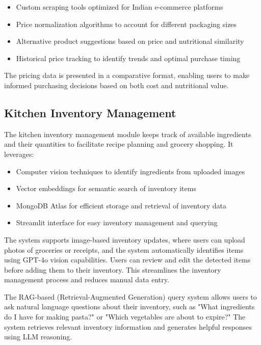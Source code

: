 \documentclass{ecai}
\begin{document}
\begin{itemize}[noitemsep,topsep=0pt]
    \item Custom scraping tools optimized for Indian e-commerce platforms
    \item Price normalization algorithms to account for different packaging sizes
    \item Alternative product suggestions based on price and nutritional similarity
    \item Historical price tracking to identify trends and optimal purchase timing
\end{itemize}

The pricing data is presented in a comparative format, enabling users to make informed purchasing decisions based on both cost and nutritional value.

\subsection{Kitchen Inventory Management}

The kitchen inventory management module keeps track of available ingredients and their quantities to facilitate recipe planning and grocery shopping. It leverages:

\begin{itemize}[noitemsep,topsep=0pt]
    \item Computer vision techniques to identify ingredients from uploaded images
    \item Vector embeddings for semantic search of inventory items
    \item MongoDB Atlas for efficient storage and retrieval of inventory data
    \item Streamlit interface for easy inventory management and querying
\end{itemize}

The system supports image-based inventory updates, where users can upload photos of groceries or receipts, and the system automatically identifies items using GPT-4o vision capabilities. Users can review and edit the detected items before adding them to their inventory. This streamlines the inventory management process and reduces manual data entry.

The RAG-based (Retrieval-Augmented Generation) query system allows users to ask natural language questions about their inventory, such as "What ingredients do I have for making pasta?" or "Which vegetables are about to expire?" The system retrieves relevant inventory information and generates helpful responses using LLM reasoning.
\end{document}
